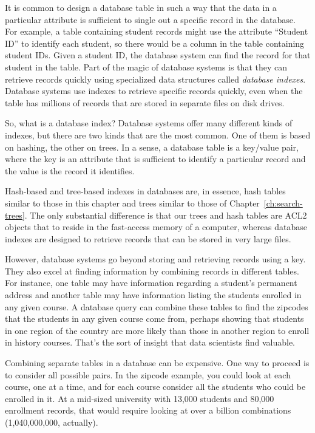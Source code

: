 It is common to design a database table in such a way that the
data in a particular attribute is sufficient
to single out a specific record in the database.
For example, a table containing student records might use the attribute
``Student ID'' to identify each student, so there would be
a column in the table containing student IDs.
Given a student ID, the
database system can find the record for that student in the
table. Part of the magic of database systems is that they can retrieve
records quickly using specialized data
structures called \emph{database indexes}.
Database systems use indexes to retrieve specific records quickly,
even when the table has millions of records that are stored
in separate files on disk drives.

So, what is a database index? Database systems
offer many different kinds of indexes, but there are two kinds that are
the most common. One of them is based on hashing, the other on trees.
In a sense, a database
table is a key/value pair, where the key is an attribute that is
sufficient to identify a particular record and the value is the record
it identifies.

Hash-based and tree-based indexes
in databases are,
in essence, hash tables similar to those in this chapter
and trees similar to those of Chapter~\ref{ch:search-trees}.
The only substantial difference
is that our trees and hash tables are ACL2 objects that
to reside in the fast-access memory of a computer,
whereas database indexes are designed to retrieve records
that can be stored in very large files.

However, database systems go beyond storing and retrieving records
using a key. They also excel at finding information by combining
records in different tables. For instance, one table may have
information regarding a student's permanent address and another table
may have information listing the students enrolled in any given course.
A database query can combine these tables to find the zipcodes that
the students in any given course come from, perhaps showing that students in one
region of the country are more likely than those in another region to
enroll in history courses. That's the sort of insight that
data scientists find valuable.

Combining separate tables in a database can be expensive.
One way to proceed is to consider all possible pairs. 
In the zipcode example, you could look at each course, 
one at a time, and for each course consider
all the students who could be enrolled in it. 
At a mid-sized university with 13,000 students 
and 80,000 enrollment records, that would require
looking at over a billion combinations (1,040,000,000, actually).

